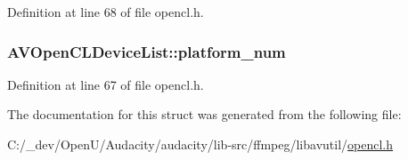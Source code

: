 Definition at line 68 of file opencl.\+h.

\subsubsection[{\texorpdfstring{platform\+\_\+num}{platform_num}}]{ A\+V\+Open\+C\+L\+Device\+List\+::platform\+\_\+num}\hypertarget{struct_a_v_open_c_l_device_list_a4149c9c19e5171d69005d8cf0605f800}{}\label{struct_a_v_open_c_l_device_list_a4149c9c19e5171d69005d8cf0605f800}


Definition at line 67 of file opencl.\+h.



The documentation for this struct was generated from the following file\+:\begin{DoxyCompactItemize}
\item 
C\+:/\+\_\+dev/\+Open\+U/\+Audacity/audacity/lib-\/src/ffmpeg/libavutil/\hyperlink{opencl_8h}{opencl.\+h}\end{DoxyCompactItemize}

